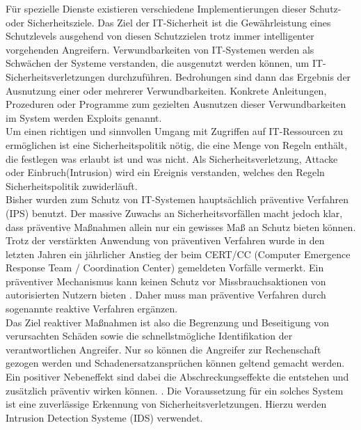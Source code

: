 \documentclass[11pt]{scrartcl}
\begin{document}
Für spezielle Dienste existieren verschiedene Implementierungen dieser
Schutz- oder Sicherheitsziele. Das Ziel der IT-Sicherheit ist die Gewährleistung eines Schutzlevels ausgehend von diesen Schutzzielen trotz  immer intelligenter vorgehenden Angreifern.
Verwundbarkeiten von IT-Systemen werden als Schwächen
der Systeme verstanden, die ausgenutzt werden können, um IT-Sicherheitsverletzungen
durchzuführen. Bedrohungen sind dann das Ergebnis der Ausnutzung einer oder mehrerer Verwundbarkeiten. Konkrete Anleitungen, Prozeduren oder Programme zum gezielten Ausnutzen dieser Verwundbarkeiten im System werden  Exploits genannt.\\
Um einen richtigen und sinnvollen Umgang mit Zugriffen auf IT-Ressourcen zu ermöglichen ist eine Sicherheitspolitik nötig, die eine Menge von Regeln enthält, die festlegen was erlaubt ist und was nicht. Als Sicherheitsverletzung, Attacke oder Einbruch(Intrusion) wird ein Ereignis verstanden, welches den Regeln Sicherheitspolitik zuwiderläuft.\\
Bisher wurden zum Schutz von IT-Systemen hauptsächlich präventive Verfahren (IPS) benutzt. Der massive Zuwachs an Sicherheitsvorfällen macht jedoch klar, dass präventive Maßnahmen allein nur ein gewisses Maß an Schutz bieten können.
Trotz der verstärkten Anwendung von präventiven Verfahren wurde in den letzten Jahren ein jährlicher Anstieg der beim CERT/CC (Computer Emergence Response
Team / Coordination Center) gemeldeten Vorfälle vermerkt. Ein präventiver Mechanismus kann keinen Schutz vor Missbrauchsaktionen von autorisierten Nutzern bieten \cite{2}. Daher muss man präventive Verfahren durch sogenannte reaktive Verfahren ergänzen.\\

Das Ziel reaktiver Maßnahmen ist also die Begrenzung und Beseitigung von verursachten Schäden sowie die schnellstmögliche Identifikation der verantwortlichen Angreifer. Nur so können die Angreifer zur Rechenschaft gezogen werden und Schadenersatzansprüchen können geltend gemacht werden. Ein positiver Nebeneffekt sind dabei die Abschreckungseffekte die entstehen und zusätzlich präventiv wirken können. \cite{2}. Die Voraussetzung für ein solches System ist eine zuverlässige Erkennung von Sicherheitsverletzungen. Hierzu werden Intrusion Detection Systeme (IDS) verwendet.\cite{3}\cite{4}\cite{5}
\end{document}
